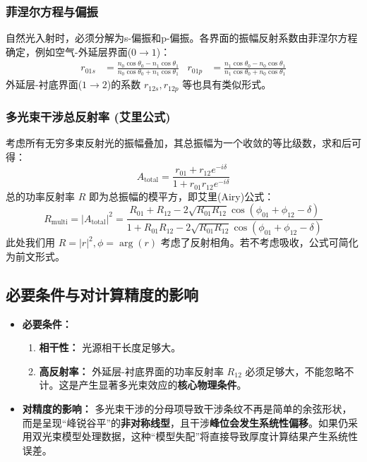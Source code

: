 \documentclass[UTF8, 12pt]{ctexart}
\begin{document}
\subsubsection{菲涅尔方程与偏振}
自然光入射时，必须分解为s-偏振和p-偏振。各界面的振幅反射系数由菲涅尔方程确定，例如空气-外延层界面($0 \to 1$)：
\begin{align}
    r_{01s} &= \frac{n_0\cos\theta_0 - n_1\cos\theta_1}{n_0\cos\theta_0 + n_1\cos\theta_1} &
    r_{01p} &= \frac{n_1\cos\theta_0 - n_0\cos\theta_1}{n_1\cos\theta_0 + n_0\cos\theta_1}
\end{align}
外延层-衬底界面($1 \to 2$)的系数 $r_{12s}, r_{12p}$ 等也具有类似形式。

\subsubsection{多光束干涉总反射率 (艾里公式)}
考虑所有无穷多束反射光的振幅叠加，其总振幅为一个收敛的等比级数，求和后可得：
\begin{equation}
    A_{\text{total}} = \frac{r_{01} + r_{12}e^{-i\delta}}{1 + r_{01}r_{12}e^{-i\delta}}
\end{equation}
总的功率反射率 $R$ 即为总振幅的模平方，即艾里(Airy)公式：
\begin{equation}
    R_{\text{multi}} = |A_{\text{total}}|^2 = \frac{R_{01} + R_{12} - 2\sqrt{R_{01}R_{12}}\cos(\phi_{01}+\phi_{12}-\delta)}{1 + R_{01}R_{12} - 2\sqrt{R_{01}R_{12}}\cos(\phi_{01}+\phi_{12}-\delta)}
    \label{eq:airy_formula}
\end{equation}
此处我们用 $R = |r|^2, \phi = \arg(r)$ 考虑了反射相角。若不考虑吸收，公式可简化为前文形式。

\subsection{必要条件与对计算精度的影响}
\begin{itemize}
    \item \textbf{必要条件：}
    \begin{enumerate}
        \item \textbf{相干性：} 光源相干长度足够大。
        \item \textbf{高反射率：} 外延层-衬底界面的功率反射率 $R_{12}$ 必须足够大，不能忽略不计。这是产生显著多光束效应的\textbf{核心物理条件}。
    \end{enumerate}
    \item \textbf{对精度的影响：} 多光束干涉的分母项导致干涉条纹不再是简单的余弦形状，而是呈现“峰锐谷平”的\textbf{非对称线型}，且干涉\textbf{峰位会发生系统性偏移}。如果仍采用双光束模型处理数据，这种“模型失配”将直接导致厚度计算结果产生系统性误差。
\end{itemize}
\end{document}
